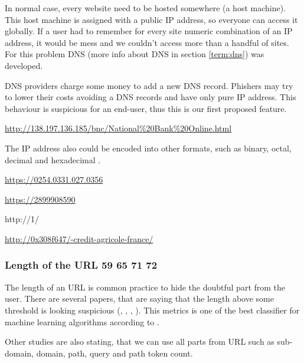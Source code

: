 \documentclass[
  digital, %
  oneside, %
  table,   %
  nolof,     %
  nolot,     %
]{fithesis3}
\newcounter{feature}
\newenvironment{feature}[1]{\stepcounter{feature}%
    \tcolorbox[beamer,%
    noparskip,breakable,
    colback=LightBlue,colframe=DarkBlue,%
    colbacklower=DarkBlue!75!LightBlue,%
    title=Feature~\thefeature: #1]}%
    {\endtcolorbox}
\begin{document}
In normal case, every website need to be hosted somewhere (a host machine). This host machine is assigned with a public IP address, so everyone can access it globally. If a user had to remember for every site numeric combination of an IP address, it would be mess and we couldn't access more than a handful of sites. For this problem DNS (more info about DNS in section \ref{term:dns}) was developed. 

DNS providers charge some money to add a new DNS record. Phishers may try to lower their costs avoiding a DNS records and have only pure IP address. This behaviour is suspicious for an end-user, thus this is our first proposed feature.

\begin{feature}{IP address in classic notation}
\centerline{\url{http://138.197.136.185/bnc/National\%20Bank\%20Online.html}}
\end{feature}

The IP address also could be encoded into other formats, such as binary, octal, decimal and hexadecimal
.

\begin{feature}{Octal}
\centerline{\url{https://0254.0331.027.0356}}
\end{feature}

\begin{feature}{Decimal (google.com)}
\centerline{\url{https://2899908590}}
\end{feature}

http://1/

\begin{feature}{Hexadecimal (google.com)}
\centerline{\url{http://0x308f647/-credit-agricole-france/}}
\end{feature}
\subsubsection{Length of the URL \cite{fresh-phish} 59 65 71 72}

The length of an URL is common practice to hide the doubtful part from the user. There are several papers, that are saying that the length above some threshold is looking suspicious     (\cite{a-url-address-aware}, \cite{beyond-blacklists}, \cite{malicious-url-detection}, \cite{off-the-hook}). This metrics is one of the best classifier for machine learning algorithms according to \cite{off-the-hook}. 

Other studies are also stating, that we can use all parts from URL such as sub-domain, domain, path, query and path token count.
\end{document}
